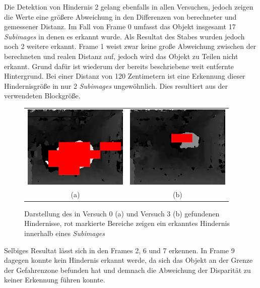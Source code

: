 \noindent
Die Detektion von Hindernis 2 gelang ebenfalls in allen Versuchen, jedoch zeigen die Werte eine größere Abweichung in den Differenzen von berechneter und gemessener Distanz. Im Fall von Frame 0 umfasst das Objekt insgesamt 17 \emph{Subimages} in denen es erkannt wurde. Als Resultat des Stabes wurden jedoch noch 2 weitere erkannt. Frame 1 weist zwar keine große Abweichung zwischen der berechneten und realen Distanz auf, jedoch wird das Objekt zu Teilen nicht erkannt. Grund dafür ist wiederum der bereits beschriebene weit entfernte Hintergrund. Bei einer Distanz von 120 Zentimetern ist eine Erkennung dieser Hindernisgröße in nur 2 \emph{Subimages} ungewöhnlich. Dies resultiert aus der verwendeten Blockgröße.\\

\begin{figure}[h]
	\centering
	\begin{tabular}{cc}
	\includegraphics[width=5cm]{img/evaluation/medium_test_0_disparity}&
	\includegraphics[width=5cm]{img/evaluation/medium_test_1_disparity}\\
	(a) & (b)
	\end{tabular}
	\caption{Darstellung des in Versuch 0 (a) und Versuch 3 (b) gefundenen Hindernisse, rot markierte Bereiche zeigen ein erkanntes Hindernis innerhalb eines \emph{Subimages} }
	\label{fig:eval_medium_fails}
\end{figure}

\noindent
Selbiges Resultat lässt sich in den Frames 2, 6 und 7 erkennen. In Frame 9 dagegen konnte kein Hindernis erkannt werde, da sich das Objekt an der Grenze der Gefahrenzone befunden hat und demnach die Abweichung der Disparität zu keiner Erkennung führen konnte.\\


